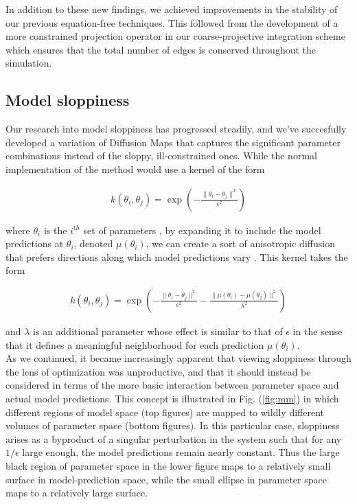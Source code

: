 \documentclass[12pt]{article}
\begin{document}
\begin{spacing}{2}
\noindent In addition to these new findings, we achieved improvements in the
stability of our previous equation-free techniques. This followed from
the development of a more constrained projection operator in our
coarse-projective integration scheme which ensures that the total
number of edges is conserved throughout the simulation.

\subsection*{Model sloppiness}

Our research into model sloppiness has progressed steadily, and we've succesfully developed a variation of Diffusion Maps that captures the significant parameter combinations instead of the sloppy, ill-constrained ones. While the normal implementation of the method would use a kernel of the form

\begin{align}
  k(\theta_i, \theta_j) = \exp(-\frac{\| \theta_i - \theta_j\|^2}{\epsilon^2})
\end{align}

\noindent where $\theta_i$ is the $i^{th}$ set of parameters \cite{coifman_diffusion_2006}, by expanding it to include the model predictions at $\theta_i$, denoted $\mu(\theta_i)$, we can create a sort of anisotropic diffusion that prefers directions along which model predictions vary \cite{lafon_stephane_diffusion_2004}. This kernel takes the form

\begin{align}
  k(\theta_i, \theta_j) = \exp(-\frac{\| \theta_i - \theta_j\|^2}{\epsilon^2} - \frac{\| \mu(\theta_i) - \mu(\theta_j)\|^2}{\lambda^2})
\end{align}

\noindent and $\lambda$ is an additional parameter whose effect is similar to that of $\epsilon$ in the sense that it defines a meaningful neighborhood for each prediction $\mu(\theta_i)$. \\

\noindent As we continued, it became increasingly apparent that viewing sloppiness through the lens of optimization was unproductive, and that it should instead be considered in terms of the more basic interaction between parameter space and actual model predictions. This concept is illustrated in Fig. (\ref{fig:mm}) in which different regions of model space (top figures) are mapped to wildly different volumes of parameter space (bottom figures). In this particular case, sloppiness arises as a byproduct of a singular perturbation in the system such that for any $1/ \epsilon$ large enough, the model predictions remain nearly constant. Thus the large black region of parameter space in the lower figure maps to a relatively small surface in model-prediction space, while the small ellipse in parameter space maps to a relatively large surface. \\


\end{spacing}
\end{document}
